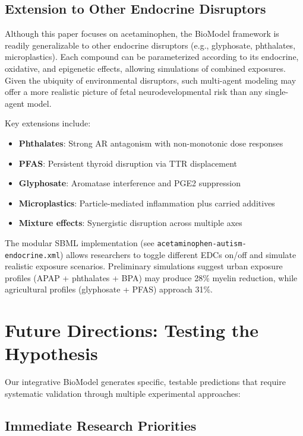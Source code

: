\documentclass[11pt]{article}
\let\oldsection\section
\renewcommand{\section}[1]{\oldsection{#1}\setlength{\leftskip}{0em}}
\let\oldsubsection\subsection
\renewcommand{\subsection}[1]{\oldsubsection{#1}\setlength{\leftskip}{0.75em}}
\begin{document}
\subsection{Extension to Other Endocrine Disruptors}

Although this paper focuses on acetaminophen, the BioModel framework is readily generalizable to other endocrine disruptors (e.g., glyphosate, phthalates, microplastics). Each compound can be parameterized according to its endocrine, oxidative, and epigenetic effects, allowing simulations of combined exposures. Given the ubiquity of environmental disruptors, such multi-agent modeling may offer a more realistic picture of fetal neurodevelopmental risk than any single-agent model.

Key extensions include:
\begin{itemize}
\item \textbf{Phthalates}: Strong AR antagonism with non-monotonic dose responses
\item \textbf{PFAS}: Persistent thyroid disruption via TTR displacement  
\item \textbf{Glyphosate}: Aromatase interference and PGE2 suppression
\item \textbf{Microplastics}: Particle-mediated inflammation plus carried additives
\item \textbf{Mixture effects}: Synergistic disruption across multiple axes
\end{itemize}

The modular SBML implementation (see \texttt{acetaminophen-autism-endocrine.xml}) allows researchers to toggle different EDCs on/off and simulate realistic exposure scenarios. Preliminary simulations suggest urban exposure profiles (APAP + phthalates + BPA) may produce 28\% myelin reduction, while agricultural profiles (glyphosate + PFAS) approach 31\%.

\section{Future Directions: Testing the Hypothesis}

Our integrative BioModel generates specific, testable predictions that require systematic validation through multiple experimental approaches:

\subsection{Immediate Research Priorities}
\end{document}
